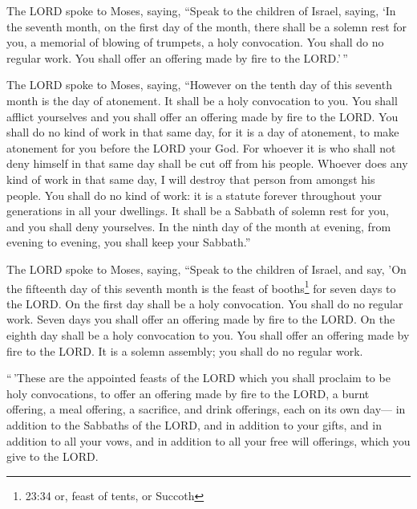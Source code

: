  The LORD spoke to Moses, saying,  ``Speak to
the children of Israel, saying, `In the seventh month, on the first day
of the month, there shall be a solemn rest for you, a memorial of
blowing of trumpets, a holy convocation.  You shall do no
regular work. You shall offer an offering made by fire to the LORD.'\,''

 The LORD spoke to Moses, saying,  ``However
on the tenth day of this seventh month is the day of atonement. It shall
be a holy convocation to you. You shall afflict yourselves and you shall
offer an offering made by fire to the LORD.  You shall do
no kind of work in that same day, for it is a day of atonement, to make
atonement for you before the LORD your God.  For whoever it
is who shall not deny himself in that same day shall be cut off from his
people.  Whoever does any kind of work in that same day, I
will destroy that person from amongst his people.  You
shall do no kind of work: it is a statute forever throughout your
generations in all your dwellings.  It shall be a Sabbath
of solemn rest for you, and you shall deny yourselves. In the ninth day
of the month at evening, from evening to evening, you shall keep your
Sabbath.''

 The LORD spoke to Moses, saying,  ``Speak to
the children of Israel, and say, 'On the fifteenth day of this seventh
month is the feast of booths\footnote{23:34 or, feast of tents, or
  Succoth} for seven days to the LORD.  On the first day
shall be a holy convocation. You shall do no regular work. 
Seven days you shall offer an offering made by fire to the LORD. On the
eighth day shall be a holy convocation to you. You shall offer an
offering made by fire to the LORD. It is a solemn assembly; you shall do
no regular work.

 ``\,'These are the appointed feasts of the LORD which you
shall proclaim to be holy convocations, to offer an offering made by
fire to the LORD, a burnt offering, a meal offering, a sacrifice, and
drink offerings, each on its own day---  in addition to the
Sabbaths of the LORD, and in addition to your gifts, and in addition to
all your vows, and in addition to all your free will offerings, which
you give to the LORD.

